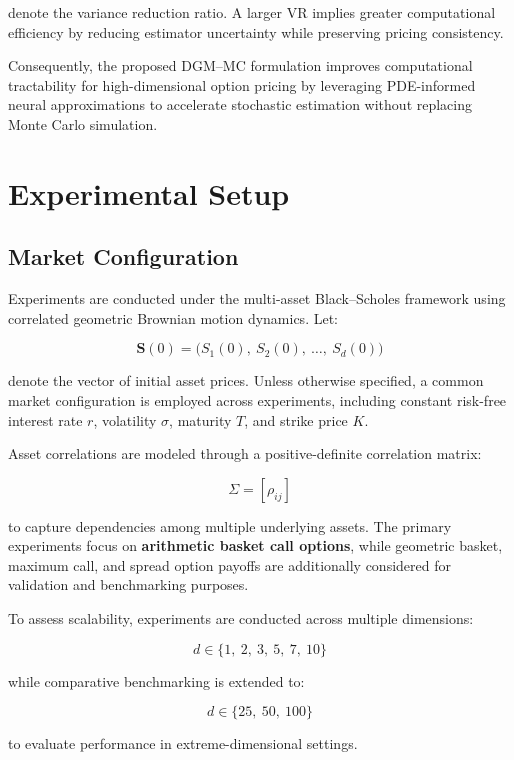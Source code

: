 \documentclass[12pt, a4paper]{article}
\begin{document}
denote the variance reduction ratio. A larger $\mathrm{VR}$ implies
greater computational efficiency by reducing estimator uncertainty
while preserving pricing consistency.

Consequently, the proposed DGM--MC formulation improves computational
tractability for high-dimensional option pricing by leveraging
PDE-informed neural approximations to accelerate stochastic estimation
without replacing Monte Carlo simulation.


\section{Experimental Setup}

\subsection{Market Configuration}

Experiments are conducted under the multi-asset Black--Scholes
framework using correlated geometric Brownian motion dynamics. Let:

\[
    \mathbf{S}(0) = \bigl(S_1(0),\ S_2(0),\ \ldots,\ S_d(0)\bigr)
\]

denote the vector of initial asset prices. Unless otherwise specified,
a common market configuration is employed across experiments, including
constant risk-free interest rate $r$, volatility $\sigma$, maturity
$T$, and strike price $K$.

Asset correlations are modeled through a positive-definite correlation
matrix:

\[
    \Sigma = [\rho_{ij}]
\]

to capture dependencies among multiple underlying assets. The primary
experiments focus on \textbf{arithmetic basket call options}, while
geometric basket, maximum call, and spread option payoffs are
additionally considered for validation and benchmarking purposes.

To assess scalability, experiments are conducted across multiple
dimensions:

\[
    d \in \{1,\ 2,\ 3,\ 5,\ 7,\ 10\}
\]

while comparative benchmarking is extended to:

\[
    d \in \{25,\ 50,\ 100\}
\]

to evaluate performance in extreme-dimensional settings.
\end{document}
